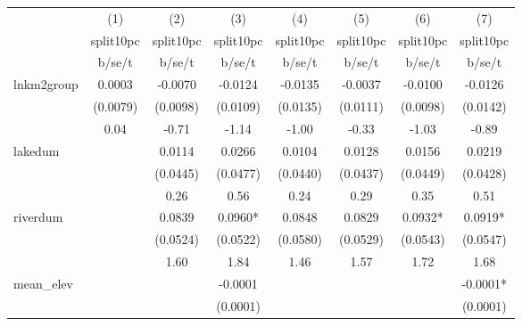{
\def\sym#1{\ifmmode^{#1}\else\(^{#1}\)\fi}
\begin{tabular}{l*{7}{c}}
\hline\hline
            &\multicolumn{1}{c}{(1)}&\multicolumn{1}{c}{(2)}&\multicolumn{1}{c}{(3)}&\multicolumn{1}{c}{(4)}&\multicolumn{1}{c}{(5)}&\multicolumn{1}{c}{(6)}&\multicolumn{1}{c}{(7)}\\
            &\multicolumn{1}{c}{split10pc}&\multicolumn{1}{c}{split10pc}&\multicolumn{1}{c}{split10pc}&\multicolumn{1}{c}{split10pc}&\multicolumn{1}{c}{split10pc}&\multicolumn{1}{c}{split10pc}&\multicolumn{1}{c}{split10pc}\\
            &      b/se/t   &      b/se/t   &      b/se/t   &      b/se/t   &      b/se/t   &      b/se/t   &      b/se/t   \\
\hline
lnkm2group  &      0.0003   &     -0.0070   &     -0.0124   &     -0.0135   &     -0.0037   &     -0.0100   &     -0.0126   \\
            &    (0.0079)   &    (0.0098)   &    (0.0109)   &    (0.0135)   &    (0.0111)   &    (0.0098)   &    (0.0142)   \\
            &        0.04   &       -0.71   &       -1.14   &       -1.00   &       -0.33   &       -1.03   &       -0.89   \\
lakedum     &               &      0.0114   &      0.0266   &      0.0104   &      0.0128   &      0.0156   &      0.0219   \\
            &               &    (0.0445)   &    (0.0477)   &    (0.0440)   &    (0.0437)   &    (0.0449)   &    (0.0428)   \\
            &               &        0.26   &        0.56   &        0.24   &        0.29   &        0.35   &        0.51   \\
riverdum    &               &      0.0839   &      0.0960*  &      0.0848   &      0.0829   &      0.0932*  &      0.0919*  \\
            &               &    (0.0524)   &    (0.0522)   &    (0.0580)   &    (0.0529)   &    (0.0543)   &    (0.0547)   \\
            &               &        1.60   &        1.84   &        1.46   &        1.57   &        1.72   &        1.68   \\
mean\_elev   &               &               &     -0.0001   &               &               &               &     -0.0001*  \\
            &               &               &    (0.0001)   &               &               &               &    (0.0001)   \\

\end{tabular}}
